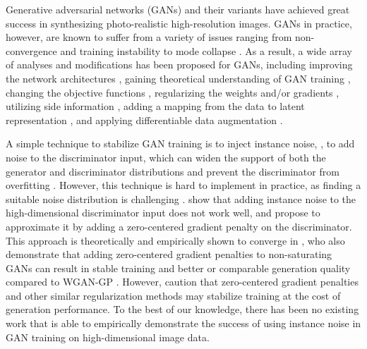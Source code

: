 \documentclass{article} \usepackage{iclr2023_conference,times}
\theoremstyle{plain}
\theoremstyle{definition}
\theoremstyle{remark}
\begin{document}
Generative adversarial networks (GANs) \citep{goodfellow2014generative} and their variants \citep{brock2018large,karras2019style,karras2020training,zhao2020differentiable} have achieved great success in synthesizing photo-realistic high-resolution 
images.  
GANs in practice, however, are known to suffer from a variety of issues ranging from non-convergence and training instability to mode collapse \citep{ Arjovsky2017TowardsPM,mescheder2018training}.
As a result, a wide array of analyses and modifications has been proposed for GANs, including 
improving the network architectures \citep{karras2019style,Radford2016UnsupervisedRL,sauer2021projected,zhang2019self}, gaining theoretical understanding of GAN training \citep{Arjovsky2017TowardsPM, heusel2017gans, Mescheder2017TheNO,mescheder2018training}, changing the objective functions \citep{arjovsky2017wasserstein,bellemare2017cramer,deshpande2018generative,li2017mmd,nowozin2016f-gan,zheng2021exploiting,yang2021data}, regularizing the weights and/or gradients \citep{arjovsky2017wasserstein,fedus2018many,mescheder2018training,Miyato2018SpectralNF,roth2017stabilizing,salimans2016improved}, utilizing side information \citep{wang2018high,zhang2017stackgan,Zhang2020Variational}, adding a mapping from the data to latent representation \citep{donahue2016adversarial,dumoulin2016adversarially,li2017alice}, and applying differentiable data augmentation \citep{karras2020training,Zhang2020Consistency,zhao2020differentiable}. 


A simple technique to stabilize GAN training is to inject instance noise, , to add noise to the discriminator input, which can widen the support of both the generator and discriminator distributions and prevent the discriminator from overfitting \citep{Arjovsky2017TowardsPM,sonderby2017amortised}. 
However, this technique is hard to implement in practice, as finding a suitable noise distribution is challenging \citep{Arjovsky2017TowardsPM}. \citet{roth2017stabilizing} show that adding instance noise to the high-dimensional discriminator input does not work well, and propose to approximate it by adding a zero-centered gradient penalty on the discriminator. This approach is theoretically and empirically shown to converge in \citet{mescheder2018training}, who also demonstrate that adding zero-centered gradient penalties to non-saturating GANs can result in stable training and better or comparable generation quality compared to WGAN-GP \citep{arjovsky2017wasserstein}. However, \citet{brock2018large} caution that zero-centered gradient penalties and other similar regularization methods may stabilize training at the cost of generation performance. To the best of our knowledge,  there has been no existing work that is able to empirically demonstrate the success of using instance noise in GAN training on high-dimensional image data.
\end{document}
